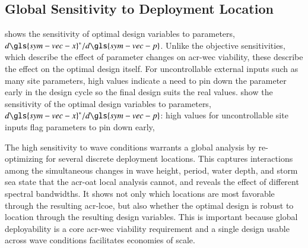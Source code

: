 \subsection{Global Sensitivity to Deployment Location}


\ifdefined\DISSERTATION
     shows the sensitivity of optimal design variables to parameters, $d\gls{sym-vec-x}^*/d\gls{sym-vec-p}$.
    Unlike the objective sensitivities, which describe the effect of parameter changes on \gls{acr-wec} viability, these describe the effect on the optimal design itself.
    For uncontrollable external inputs such as many site parameters, high values indicate a need to pin down the parameter early in the design cycle so the final design suits the real values.
\else
    show the sensitivity of the optimal design variables to parameters, $d\gls{sym-vec-x}^*/d\gls{sym-vec-p}$:
    high values for uncontrollable site inputs flag parameters to pin down early,
\fi

\ifdefined\DISSERTATION
    The high sensitivity to wave conditions warrants a global analysis by re-optimizing for several discrete deployment locations.
    This captures interactions among the simultaneous changes in wave height, period, water depth, and storm sea state that the \gls{acr-oat} local analysis cannot, and reveals the effect of different spectral bandwidths.
    It shows not only which locations are most favorable through the resulting \gls{acr-lcoe}, but also whether the optimal design is robust to location through the resulting design variables.
    This is important because global deployability is a core \gls{acr-wec} viability requirement \citep{bull_systems_2017} and a single design usable across wave conditions facilitates economies of scale.
    
